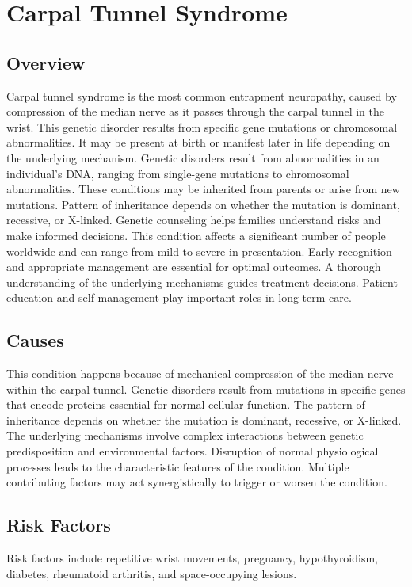\chapter{Carpal Tunnel Syndrome}
\label{sec:Carpal Tunnel Syndrome}

\section{Overview}
Carpal tunnel syndrome is the most common entrapment neuropathy, caused by compression of the median nerve as it passes through the carpal tunnel in the wrist. This genetic disorder results from specific gene mutations or chromosomal abnormalities. It may be present at birth or manifest later in life depending on the underlying mechanism. Genetic disorders result from abnormalities in an individual's DNA, ranging from single-gene mutations to chromosomal abnormalities. These conditions may be inherited from parents or arise from new mutations. Pattern of inheritance depends on whether the mutation is dominant, recessive, or X-linked. Genetic counseling helps families understand risks and make informed decisions. This condition affects a significant number of people worldwide and can range from mild to severe in presentation. Early recognition and appropriate management are essential for optimal outcomes. A thorough understanding of the underlying mechanisms guides treatment decisions. Patient education and self-management play important roles in long-term care.
\section{Causes}
This condition happens because of mechanical compression of the median nerve within the carpal tunnel. Genetic disorders result from mutations in specific genes that encode proteins essential for normal cellular function. The pattern of inheritance depends on whether the mutation is dominant, recessive, or X-linked. The underlying mechanisms involve complex interactions between genetic predisposition and environmental factors. Disruption of normal physiological processes leads to the characteristic features of the condition. Multiple contributing factors may act synergistically to trigger or worsen the condition.
\section{Risk Factors}
Risk factors include repetitive wrist movements, pregnancy, hypothyroidism, diabetes, rheumatoid arthritis, and space-occupying lesions.

